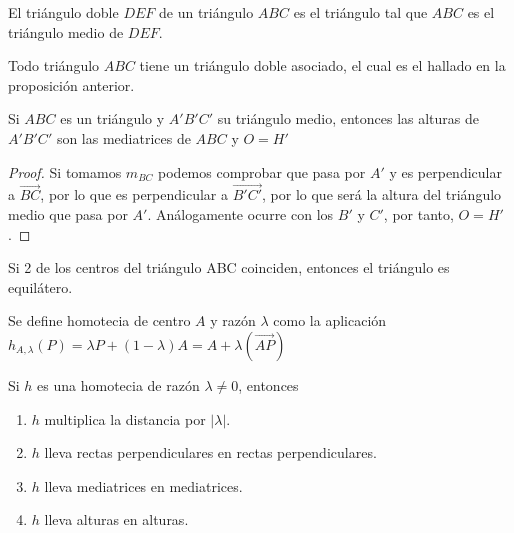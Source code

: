 \begin{ndef}
  El triángulo doble $DEF$ de un triángulo $ABC$ es el triángulo tal que $ABC$ es el triángulo medio de $DEF$.
\end{ndef}

\begin{ndef}
  Todo triángulo $ABC$ tiene un triángulo doble asociado, el cual es el hallado en la proposición anterior.
\end{ndef}


\begin{nprop}
  Si $ABC$ es un triángulo y $A'B'C'$ su triángulo medio, entonces las alturas de $A'B'C'$ son las mediatrices de $ABC$ y $O=H'$
\end{nprop}
\begin{proof}
  Si tomamos $m_{BC}$ podemos comprobar que pasa por $A'$ y es perpendicular a $\vec{BC}$, por lo que es perpendicular a $\vec{B'C'}$, por lo que será la altura del triángulo medio que pasa por $A'$. Análogamente ocurre con los $B'$ y $C'$, por tanto, $O=H'$.
\end{proof}


\begin{nprop}Si 2 de los centros del triángulo ABC coinciden, entonces el triángulo es equilátero.
\end{nprop}


\begin{ndef}[Homotecia]
  Se define homotecia de centro $A$ y razón $\lambda$ como la aplicación $h_{A,\lambda}(P) = \lambda P + (1-\lambda)A = A+\lambda(\vec{AP})$
\end{ndef}

\begin{nprop} Si $h$ es una homotecia de razón $\lambda\ne 0$, entonces
\begin{enumerate}
\item $h$ multiplica la distancia por $|\lambda|$.
\item $h$ lleva rectas perpendiculares en rectas perpendiculares.
\item $h$ lleva mediatrices en mediatrices.
\item $h$ lleva alturas en alturas.
\end{enumerate}
\end{nprop}

